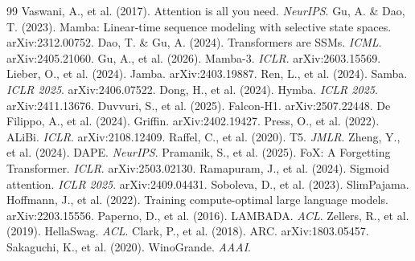 \documentclass[11pt]{article}
\begin{document}

\begin{thebibliography}{99}
 Vaswani, A., et al. (2017). Attention is all you need. \emph{NeurIPS}.
 Gu, A. \& Dao, T. (2023). Mamba: Linear-time sequence modeling with selective state spaces. arXiv:2312.00752.
 Dao, T. \& Gu, A. (2024). Transformers are SSMs. \emph{ICML}. arXiv:2405.21060.
 Gu, A., et al. (2026). Mamba-3. \emph{ICLR}. arXiv:2603.15569.
 Lieber, O., et al. (2024). Jamba. arXiv:2403.19887.
 Ren, L., et al. (2024). Samba. \emph{ICLR 2025}. arXiv:2406.07522.
 Dong, H., et al. (2024). Hymba. \emph{ICLR 2025}. arXiv:2411.13676.
 Duvvuri, S., et al. (2025). Falcon-H1. arXiv:2507.22448.
 De Filippo, A., et al. (2024). Griffin. arXiv:2402.19427.
 Press, O., et al. (2022). ALiBi. \emph{ICLR}. arXiv:2108.12409.
 Raffel, C., et al. (2020). T5. \emph{JMLR}.
 Zheng, Y., et al. (2024). DAPE. \emph{NeurIPS}.
 Pramanik, S., et al. (2025). FoX: A Forgetting Transformer. \emph{ICLR}. arXiv:2503.02130.
 Ramapuram, J., et al. (2024). Sigmoid attention. \emph{ICLR 2025}. arXiv:2409.04431.
 Soboleva, D., et al. (2023). SlimPajama.
 Hoffmann, J., et al. (2022). Training compute-optimal large language models. arXiv:2203.15556.
 Paperno, D., et al. (2016). LAMBADA. \emph{ACL}.
 Zellers, R., et al. (2019). HellaSwag. \emph{ACL}.
 Clark, P., et al. (2018). ARC. arXiv:1803.05457.
 Sakaguchi, K., et al. (2020). WinoGrande. \emph{AAAI}.
\end{thebibliography}

\appendix
\end{document}
